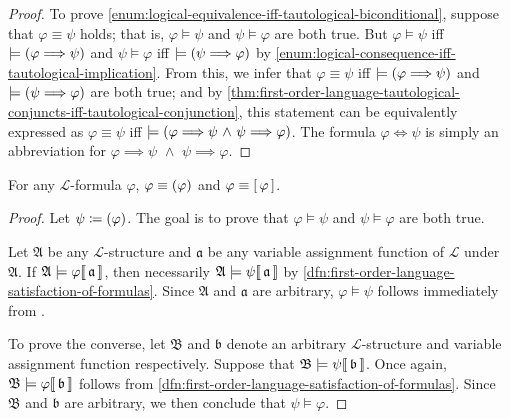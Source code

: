 \begin{proof}
    \vspace{0.3cm}
    \noindent
    To prove \ref{enum:logical-equivalence-iff-tautological-biconditional}, suppose that \( \varphi \equiv \psi \) holds;
    that is, \( \varphi \models \psi \) and \( \psi \models \varphi \) are both true.
    But \( \varphi \models \psi \) iff \( \models \mleft( \varphi {\implies} \psi \mright) \)
    and \( \psi \models \varphi \) iff \( \models \mleft( \psi {\implies} \varphi \mright) \)
    by \ref{enum:logical-consequence-iff-tautological-implication}.
    From this, we infer that \( \varphi \equiv \psi \) iff \( \models \mleft( \varphi {\implies} \psi \mright) \) and \( \models \mleft( \psi {\implies} \varphi \mright) \)
    are both true; and by \cref{thm:first-order-language-tautological-conjuncts-iff-tautological-conjunction}, this statement can be equivalently expressed as
    \( \varphi \equiv \psi \) iff \( \models \mleft( \varphi {\implies} \psi \,\,{\land}\,\, \psi {\implies} \varphi \mright) \).
    The formula \( \varphi {\iff} \psi \) is simply an abbreviation for \( \varphi {\implies} \psi \,\,{\land}\,\, \psi {\implies} \varphi \).
\end{proof}

\begin{thm}
     \label{logical-equivalence:parenthesized-formulas-are-logically-equivalent}
    For any \( \mathcal{L} \)-formula \( \varphi \), \( \varphi \equiv \mleft( \varphi \mright) \) and \( \varphi \equiv \mleft[ \,\varphi\, \mright] \).
\end{thm}

\begin{proof}
    Let \( \psi \coloneq \mleft( \varphi \mright) \). The goal is to prove that \( \varphi \models \psi \) and \( \psi \models \varphi \) are both true.

    \vspace{0.3cm}
    \noindent
    Let \( \mathfrak{A} \) be any \( \mathcal{L} \)-structure and \( \mathfrak{a} \) be any variable assignment function of \( \mathcal{L} \) under \( \mathfrak{A} \).
    If \(  \mathfrak{A} \models \varphi\llbracket\, \mathfrak{a} \,\rrbracket \), then necessarily \(  \mathfrak{A} \models \psi\llbracket\, \mathfrak{a} \,\rrbracket \)
    by \cref{dfn:first-order-language-satisfaction-of-formulas}.
    Since \( \mathfrak{A} \) and \( \mathfrak{a} \) are arbitrary, \( \varphi \models \psi \) follows immediately from
    .

    \vspace{0.3cm}
    \noindent
    To prove the converse, let \( \mathfrak{B} \) and \( \mathfrak{b} \) denote an arbitrary \( \mathcal{L} \)-structure and variable assignment function respectively.
    Suppose that \(  \mathfrak{B} \models \psi\llbracket\, \mathfrak{b} \,\rrbracket \). Once again, \(  \mathfrak{B} \models \varphi\llbracket\, \mathfrak{b} \,\rrbracket \)
    follows from \cref{dfn:first-order-language-satisfaction-of-formulas}. Since \( \mathfrak{B} \) and \( \mathfrak{b} \) are arbitrary,
    we then conclude that \( \psi \models \varphi \).
\end{proof}

